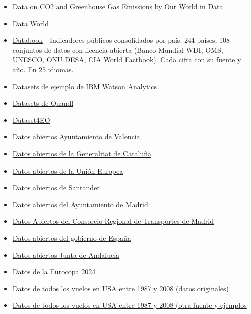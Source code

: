 \documentclass[
  letterpaper,
  DIV=11,
  numbers=noendperiod]{scrartcl}
\begin{document}
\begin{itemize}
  \href{https://data-kicks.com/index.php/blog/}{Data Kicks}
\item
  \href{https://github.com/owid/co2-data/tree/master}{Data on CO2 and
  Greenhouse Gas Emissions by Our World in Data}
\item
  \href{https://data.world/}{Data World}
\item
  \href{https://databook.dataint.net/es/paises/espana/}{Databook} -
  Indicadores públicos consolidados por país: 244 países, 108 conjuntos
  de datos con licencia abierta (Banco Mundial WDI, OMS, UNESCO, ONU
  DESA, CIA World Factbook). Cada cifra con su fuente y año. En 25
  idiomas.
\item
  \href{https://www.ibm.com/communities/analytics/watson-analytics-blog/guide-to-sample-datasets/}{Datasets
  de ejemplo de IBM Watson Analytics}
\item
  \href{https://www.quandl.com/search?query=}{Datasets de Quandl}
\item
  \href{https://github.com/EarthNets/Dataset4EO}{Dataset4EO}
\item
  \href{https://www.valencia.es/cas/ayuntamiento/gobierno-abierto}{Datos
  abiertos Ayuntamiento de Valencia}
\item
  \href{http://dadesobertes.gencat.cat/es/}{Datos abiertos de la
  Generalitat de Cataluña}
\item
  \href{https://data.europa.eu/es}{Datos abiertos de la Unión Europea}
\item
  \href{http://datos.santander.es/}{Datos abiertos de Santander}
\item
  \href{http://datos.madrid.es/}{Datos abiertos del Ayuntamiento de
  Madrid}
\item
  \href{https://datos.crtm.es/}{Datos Abiertos del Consorcio Regional de
  Transportes de Madrid}
\item
  \href{http://datos.gob.es/}{Datos abiertos del gobierno de España}
\item
  \href{http://www.juntadeandalucia.es/datosabiertos/portal.html}{Datos
  abiertos Junta de Andalucía}
\item
  \href{https://github.com/Jelagmil/Euro2024_data}{Datos de la Eurocopa
  2024}
\item
  \href{http://stat-computing.org/dataexpo/2009/the-data.html}{Datos de
  todos los vuelos en USA entre 1987 y 2008 (datos originales)}
\item
  \href{https://github.com/h2oai/h2o-2/wiki/Hacking-Airline-DataSet-with-H2O}{Datos
  de todos los vuelos en USA entre 1987 y 2008 (otra fuente y ejemplos
}
\end{itemize}
\end{document}
